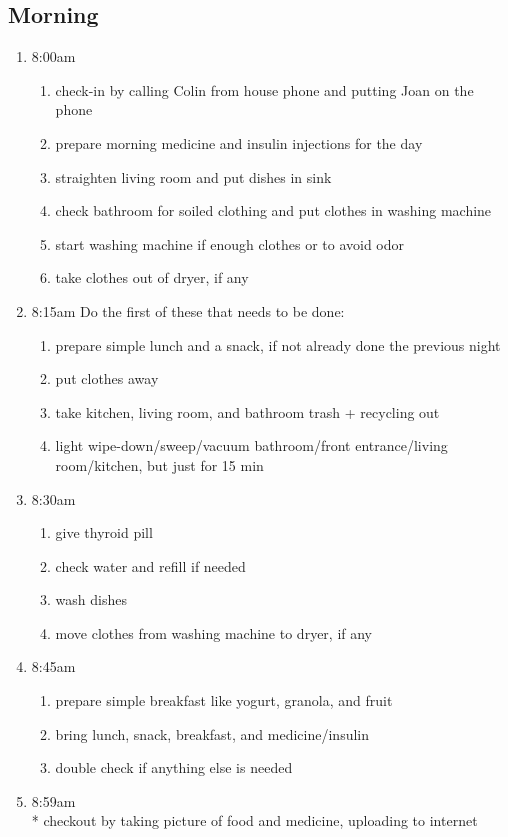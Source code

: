 \documentclass[12pt,letterpaper]{article}
\begin{document}
\begin{multicols}{2}
	\subsection*{Morning}
	\begin{enumerate}
		\item 8:00am
			\begin{enumerate}
				\item check-in by calling Colin from house phone and putting Joan on the phone
				\item prepare morning medicine and insulin injections for the day
				\item straighten living room and put dishes in sink
				\item check bathroom for soiled clothing and put clothes in washing machine
				\item start washing machine if enough clothes or to avoid odor
				\item take clothes out of dryer, if any
			\end{enumerate}
		\item 8:15am
			Do the first of these that needs to be done:
			\begin{enumerate}
				\item prepare simple lunch and a snack, if not already done the previous night
				\item put clothes away
				\item take kitchen, living room, and bathroom trash + recycling out
				\item light wipe-down/sweep/vacuum bathroom/front entrance/living room/kitchen, but just for 15 min
			\end{enumerate}
		\item 8:30am
			\begin{enumerate}
				\item give thyroid pill
				\item check water and refill if needed
				\item wash dishes
				\item move clothes from washing machine to dryer, if any
			\end{enumerate}
		\item 8:45am
			\begin{enumerate}
				\item prepare simple breakfast like yogurt, granola, and fruit
				\item bring lunch, snack, breakfast, and medicine/insulin
				\item double check if anything else is needed
			\end{enumerate}
		\item 8:59am \\*
			checkout by taking picture of food and medicine, uploading to internet
	\end{enumerate}


\end{multicols}
\end{document}

